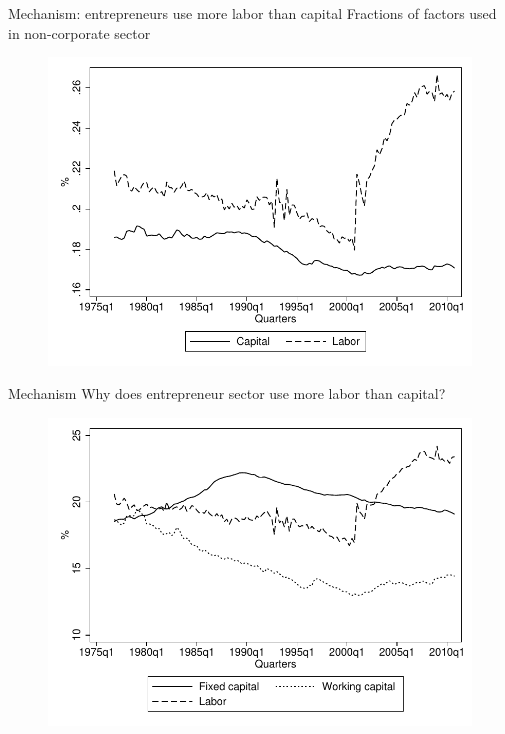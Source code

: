 \documentclass[svgnames]{beamer}
\begin{document}
\begin{frame}{Mechanism: entrepreneurs use more labor than capital}
{Fractions of factors used in non-corporate sector}
\begin{figure}[!ht]
\includegraphics[width=1\textwidth]{graph/klratio.pdf}
\end{figure}
\end{frame}

\begin{frame}{Mechanism}
{Why does entrepreneur sector use more labor than capital?}
\begin{figure}[!ht]
\includegraphics[width=1\textwidth]{graph/wklratio.pdf}
\end{figure}
\end{frame}
\end{document}
